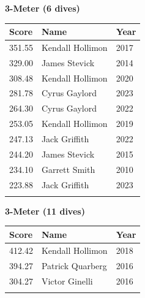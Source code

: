 \noindent\begin{minipage}[t]{0.48\textwidth}
\centering
\textbf{\textcolor{teamprimary}{3-Meter (6 dives)}}\par
\vspace{0.5em}
\centering
\small
\renewcommand{\arraystretch}{1.0}
\setlength{\tabcolsep}{4pt}
\begin{tabular}{@{}p{1.8cm}p{3.0cm}p{1.0cm}@{}}
\toprule
\textbf{Score} & \textbf{Name} & \textbf{Year} \\
\midrule
351.55 & Kendall Hollimon & 2017 \\
329.00 & James Stevick & 2014 \\
308.48 & Kendall Hollimon & 2020 \\
281.78 & Cyrus Gaylord & 2023 \\
264.30 & Cyrus Gaylord & 2022 \\
253.05 & Kendall Hollimon & 2019 \\
247.13 & Jack Griffith & 2022 \\
244.20 & James Stevick & 2015 \\
234.10 & Garrett Smith & 2010 \\
223.88 & Jack Griffith & 2023 \\
\bottomrule
\vspace{0.5em}
\end{tabular}
\end{minipage}
\hfill
\begin{minipage}[t]{0.48\textwidth}
\centering
\textbf{\textcolor{teamprimary}{3-Meter (11 dives)}}\par
\vspace{0.5em}
\centering
\small
\renewcommand{\arraystretch}{1.0}
\setlength{\tabcolsep}{4pt}
\begin{tabular}{@{}p{1.8cm}p{3.0cm}p{1.0cm}@{}}
\toprule
\textbf{Score} & \textbf{Name} & \textbf{Year} \\
\midrule
412.42 & Kendall Hollimon & 2018 \\
394.27 & Patrick Quarberg & 2016 \\
304.27 & Victor Ginelli & 2016 \\
\bottomrule
\vspace{0.5em}
\end{tabular}
\end{minipage}
\vspace{1.2em}
